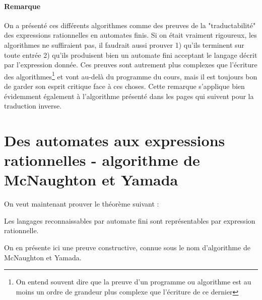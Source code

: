 \paragraph*{Remarque} On a présenté ces différents algorithmes comme des preuves de la "traductabilité" des expressions rationnelles en automates finis. Si on était vraiment rigoureux, les algorithmes ne suffiraient pas, il faudrait aussi prouver 1) qu'ils terminent sur toute entrée 2) qu'ils produisent bien un automate fini acceptant le langage décrit par l'expression donnée. Ces preuves sont autrement plus complexes que l'écriture des algorithmes\footnote{On entend souvent dire que la preuve d'un programme ou algorithme est au moins un ordre de grandeur plus complexe que l'écriture de ce dernier} et vont au-delà du programme du cours, mais il est toujours bon de garder son esprit critique face à ces choses. Cette remarque s'applique bien évidemment également à l'algorithme présenté dans les pages qui suivent pour la traduction inverse.



\section{Des automates aux expressions rationnelles - algorithme de McNaughton et Yamada}

On veut maintenant prouver le théorème suivant :

\begin{theorem}
Les langages reconnaissables par automate fini sont représentables par expression rationnelle.
\end{theorem}

On en présente ici une preuve constructive, connue sous le nom d'algorithme de McNaughton et Yamada.

